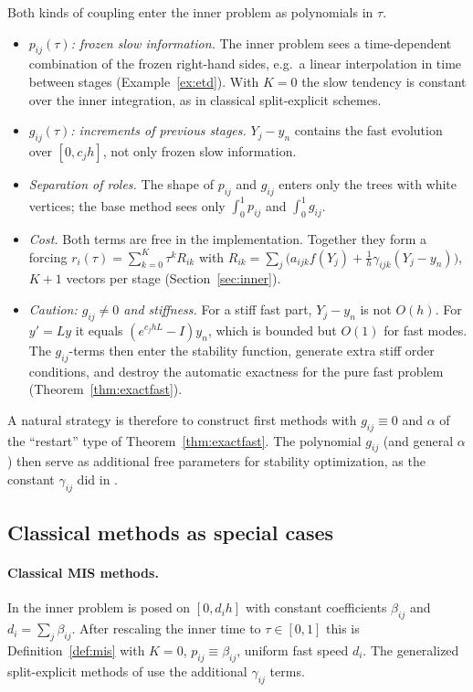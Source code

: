 \documentclass[11pt,a4paper]{article}
\theoremstyle{definition}
\theoremstyle{remark}
\begin{document}
Both kinds of coupling enter the inner problem as polynomials in $\tau$.
\begin{itemize}
\item \emph{$p_{ij}(\tau)$: frozen slow information.} The inner problem
  sees a time-dependent combination of the frozen right-hand sides, e.g.\
  a linear interpolation in time between stages (Example~\ref{ex:etd}).
  With $K=0$ the slow tendency is constant over the inner integration,
  as in classical split-explicit schemes.
\item \emph{$g_{ij}(\tau)$: increments of previous stages.} $Y_j-y_n$
  contains the fast evolution over $[0,c_jh]$, not only frozen slow
  information.
\item \emph{Separation of roles.} The shape of $p_{ij}$ and $g_{ij}$
  enters only the trees with white vertices; the base method sees only
  $\int_0^1p_{ij}$ and $\int_0^1g_{ij}$.
\item \emph{Cost.} Both terms are free in the implementation. Together
  they form a forcing $r_i(\tau)=\sum_{k=0}^K\tau^kR_{ik}$ with
  $R_{ik}=\sum_j\big(a_{ijk}f(Y_j)+\tfrac1h\gamma_{ijk}(Y_j-y_n)\big)$,
  $K+1$ vectors per stage (Section~\ref{sec:inner}).
\item \emph{Caution: $g_{ij}\ne0$ and stiffness.} For a stiff fast part,
  $Y_j-y_n$ is not $O(h)$. For $y'=Ly$ it equals $(e^{c_jhL}-I)y_n$,
  which is bounded but $O(1)$ for fast modes. The $g_{ij}$-terms then
  enter the stability function, generate extra stiff order conditions,
  and destroy the automatic exactness for the pure fast problem
  (Theorem~\ref{thm:exactfast}).
\end{itemize}
A natural strategy is therefore to construct first methods with
$g_{ij}\equiv0$ and $\alpha$ of the ``restart'' type of
Theorem~\ref{thm:exactfast}. The polynomial $g_{ij}$ (and general
$\alpha$) then serve as additional free parameters for stability
optimization, as the constant $\gamma_{ij}$ did in \cite{KnothWensch2014}.

\subsection{Classical methods as special cases}
\label{sec:specialcases}

\paragraph{Classical MIS methods.}
In \cite{WenschKnothGalant2009} the inner problem is posed on
$[0,d_ih]$ with constant coefficients $\beta_{ij}$ and
$d_i=\sum_j\beta_{ij}$. After rescaling the inner time to
$\tau\in[0,1]$ this is Definition~\ref{def:mis} with $K=0$,
$p_{ij}\equiv\beta_{ij}$, uniform fast speed $d_i$. The generalized
split-explicit methods of \cite{KnothWensch2014} use the additional
$\gamma_{ij}$ terms.
\end{document}
